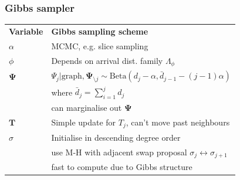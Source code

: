 \documentclass[final,hyperref={pdfpagelabels=false},noamsthm]{beamer}
\newcommand{\bfT}{\mathbf{T}}
\newcommand{\bfPsi}{\boldsymbol{\Psi}}
\begin{document}
\begin{frame}
	\frametitle{Gibbs sampler}
	\begin{center}
		\begin{tabular}{l|l}
			\textbf{Variable} & \textbf{Gibbs sampling scheme} \\
			\Xhline{4\arrayrulewidth}
			\rule{0pt}{3ex}
			$\alpha$ & MCMC, e.g. slice sampling \\
			\hline
			\rule{0pt}{3ex}
			$\phi$ & Depends on arrival dist. family $\Lambda_\phi$ \\
			\hline
			\rule{0pt}{3ex}
			$\mathbf{\Psi}$ & $\Psi_j | \text{graph}, \mathbf{\Psi}_{\setminus j} \sim \text{Beta}(d_{j} - \alpha, \bar{d}_{j-1} - (j-1)\alpha)$ \\
			& \quad where $\bar{d}_{j} = \sum_{i=1}^j d_{j}$ \\
			& \quad can marginalise out $\bfPsi$ \\
			\hline
			\rule{0pt}{3ex}
			$\mathbf{T}$ & Simple update for $T_j$, can't move past neighbours \\
			\hline
			\rule{0pt}{3ex}
			$\sigma$ & Initialise in descending degree order \\
			& \quad use M-H with adjacent swap proposal $\sigma_j \leftrightarrow \sigma_{j+1}$\\
			& \quad fast to compute due to Gibbs structure
		\end{tabular}
	\end{center}
\end{frame}

%
%
%
%
%
\end{document}
